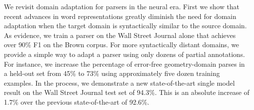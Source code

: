 We revisit domain adaptation for parsers in the neural era. First we show that recent advances in word representations greatly diminish the need for domain adaptation when the target domain is syntactically similar to the source domain. As evidence, we train a parser on the Wall Street Journal alone that achieves over 90\% F1 on the Brown corpus. For more syntactically distant domains, we provide a simple way to adapt a parser using only dozens of partial annotations. For instance, we increase the percentage of error-free geometry-domain parses in a held-out set from 45\% to 73\% using approximately five dozen training examples. In the process, we demonstrate a new state-of-the-art single model result  on the Wall Street Journal test set of 94.3\%. This is an absolute increase of 1.7\% over the previous state-of-the-art of 92.6\%.
